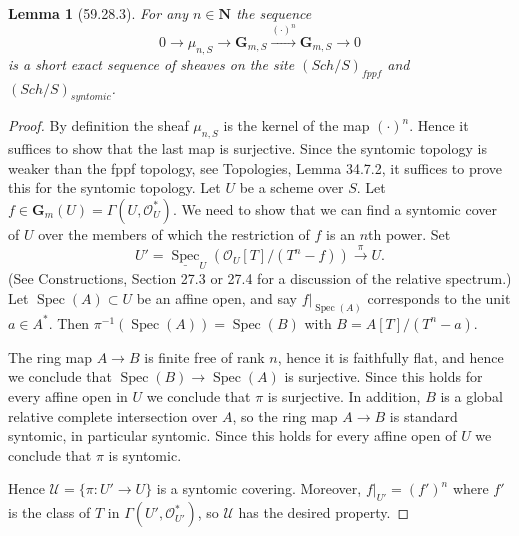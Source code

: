 \documentclass[UTF8,11pt]{ctexart}
\newtheorem*{lemma}{Lemma}
\theoremstyle{definition}
\begin{document}
\begin{lemma}[59.28.3]
For any $n\in\mathbf N$ the sequence
\[0\to\mu_{n,S}\to\mathbf G_{m,S}\xrightarrow{(\cdot)^n}\mathbf G_{m,S}\to0\]
is a short exact sequence of sheaves on the site $(\mathit{Sch}/S)_{fppf}$ and $(\mathit{Sch}/S)_{syntomic}$.
\end{lemma}
\begin{proof}
By definition the sheaf $\mu_{n,S}$ is the kernel of the map $(\cdot)^n$. Hence it suffices to show that the last map is surjective. Since the syntomic topology is weaker than the fppf topology, see Topologies, Lemma 34.7.2, it suffices to prove this for the syntomic topology. Let $U$ be a scheme over $S$. Let $f\in\mathbf G_m(U)=\Gamma(U,\mathcal O_U^*)$. We need to show that we can find a syntomic cover of $U$ over the members of which the restriction of $f$ is an $n$th power. Set
\[U'=\underline{\operatorname{Spec}}_U(\mathcal O_U[T]/(T^n-f))\xrightarrow{\pi}U.\]
(See Constructions, Section 27.3 or 27.4 for a discussion of the relative spectrum.) Let $\operatorname{Spec}(A)\subset U$ be an affine open, and say $f|_{\operatorname{Spec}(A)}$ corresponds to the unit $a\in A^*$. Then $\pi^{-1}(\operatorname{Spec}(A))=\operatorname{Spec}(B)$ with $B=A[T]/(T^n-a)$.

The ring map $A\to B$ is finite free of rank $n$, hence it is faithfully flat, and hence we conclude that $\operatorname{Spec}(B)\to\operatorname{Spec}(A)$ is surjective. Since this holds for every affine open in $U$ we conclude that $\pi$ is surjective. In addition, $B$ is a global relative complete intersection over $A$, so the ring map $A\to B$ is standard syntomic, in particular syntomic. Since this holds for every affine open of $U$ we conclude that $\pi$ is syntomic.

Hence $\mathcal U=\{\pi:U'\to U\}$ is a syntomic covering. Moreover, $f|_{U'}=(f')^n$ where $f'$ is the class of $T$ in $\Gamma(U',\mathcal O_{U'}^*)$, so $\mathcal U$ has the desired property.
\end{proof}
\end{document}
